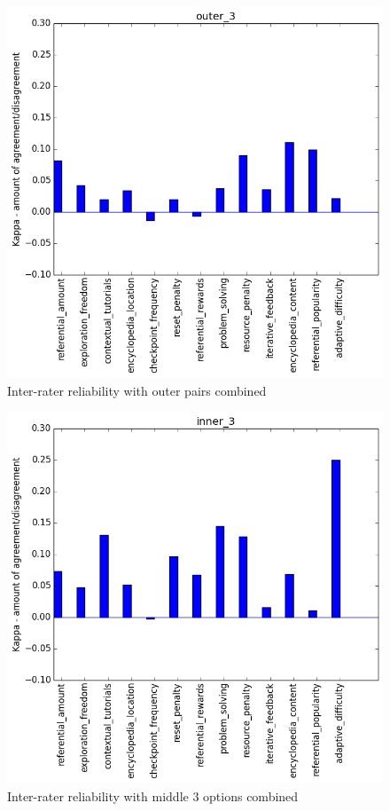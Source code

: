 				\begin{figure}[] 
					\centering 
					\includegraphics[width=\textwidth, height=.4\textheight, keepaspectratio=true]{outer_3_stats.png} 
					\caption{Inter-rater reliability with outer pairs combined}
				\end{figure}
				\begin{figure}[] 
					\centering 
					\includegraphics[width=\textwidth, height=.4\textheight, keepaspectratio=true]{inner_3_stats.png} 
					\caption{Inter-rater reliability with middle 3 options combined}
				\end{figure}

